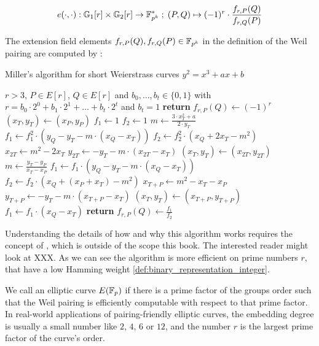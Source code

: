 \begin{equation}\label{eq:weil-pairing}
e(\cdot,\cdot) : \mathbb{G}_1[r] \times \mathbb{G}_2[r] \to \mathbb{F}^*_{p^k}\; ;\; 
(P,Q)\mapsto (-1)^r \cdot \frac{f_{r,P}(Q)}{f_{r,Q}(P)}
\end{equation} 

The extension field elements $f_{r,P}(Q), f_{r,Q}(P)\in \mathbb{F}_{p^k}$ in the definition of the Weil pairing are computed by :
\begin{algorithm}\caption{Miller's algorithm for short Weierstrass curves $y^2 = x^3 +ax +b$}
\begin{algorithmic}[0]
\Require $r>3$, $P \in E[r]$, $Q\in E[r]$ and
\State $b_0,\ldots, b_t\in \{0,1\}$ with $r= b_0\cdot 2^0 + b_1\cdot 2^1 + \ldots + b_t\cdot 2^t$ and $b_t=1$
	\State \textbf{return} $f_{r,P}(Q) \gets (-1)^r$
\EndIf
\State $(x_T,y_T) \gets (x_P,y_P)$
\State $f_1\gets 1$
\State $f_2\gets 1$
	\State $m \gets \frac{3\cdot x_T^2+a}{2\cdot y_T}$	
    \State $f_1 \gets f_1^2\cdot (y_Q - y_T - m\cdot(x_Q-x_T))$
	\State $f_2 \gets f_2^2\cdot (x_Q + 2x_T -m^2)$
	\State $x_{2T} \gets m^2 - 2 x_T$
	\State $y_{2T} \gets -y_T - m\cdot (x_{2T}-x_T)$
	\State $(x_T,y_T)\gets (x_{2T},y_{2T})$ 
		\State $m \gets \frac{y_T -y_P}{x_T - x_P}$
		\State $f_1 \gets f_1\cdot (y_Q -y_T -m\cdot (x_Q - x_T))$
		\State $f_2 \gets f_2\cdot (x_Q + (x_P+x_T) - m^2)$
		\State $x_{T+P} \gets m^2 -x_T -x_P$
		\State $y_{T+P}\gets -y_T - m\cdot (x_{T+P}-x_T)$
		\State $(x_T,y_T)\gets (x_{T+P},y_{T+P})$
	\EndIf
\EndFor
\State $f_1 \gets f_1\cdot (x_Q - x_T)$
\State \textbf{return} $f_{r,P}(Q) \gets \frac{f_1}{f_2}$
\EndProcedure
\end{algorithmic}
\end{algorithm}

Understanding the details of how and why this algorithm works requires the concept of , which is outside of the scope this book. The interested reader might look at XXX. As we can see the algorithm is more efficient on prime numbers $r$, that have a low Hamming weight \ref{def:binary_representation_integer}.

We call an elliptic curve $E(\mathbb{F}_p)$  if there is a prime factor of the groups order such that the Weil pairing is efficiently computable with respect to that prime factor. In real-world applications of pairing-friendly elliptic curves, the embedding degree is usually a small number like $2$, $4$, $6$ or $12$, and the number $r$ is the largest prime factor of the curve's order. 

